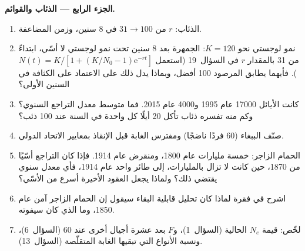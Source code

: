 \begin{problem}
\medskip
\noindent\textbf{الجزء الرابع --- الذئاب والقوائم.}
\begin{enumerate}[resume]
  \item الذئاب: $r$ من $31 \to 100$ في 8 سنين، وزمن المضاعفة.
  \item نمو لوجستي نحو $K = 120$: الجمهرة بعد 8 سنين
        تحت نمو لوجستي لا أسّي، ابتداءً من 31
        بالمقدار $r$ في السؤال~19 (استعمل $N(t) = K/[1 + (K/N_{0} -
        1)\mathrm{e}^{-rt}]$). فأيهما يطابق المرصود 100 أفضل، وبماذا
        يدل ذلك على الاعتماد على الكثافة في السنين الأولى؟
  \item كانت الأيائل \num{17000} عام 1995 و\num{4000} عام 2015.
        فما متوسط معدل التراجع السنوي؟ وكم منه تفسره ذئاب تأكل
        \num{20} أيلًا كل واحدة في السنة عند 100 ذئب؟
  \item صنّف الببغاء (60 فردًا ناضجًا) ومفترس الغابة قبل
        الإنقاذ بمعايير الاتحاد الدولي.
  \item الحمام الزاجر: خمسة مليارات عام 1800، ومنقرض عام 1914. فإذا كان
        التراجع أسّيًا من 1870، حين كانت لا تزال بالمليارات،
        إلى طائر واحد عام 1914، فأي معدل سنوي يقتضي ذلك؟
        ولماذا يجعل  العقود الأخيرة أسرع من الأسّي؟
  \item اشرح في فقرة لماذا كان تحليل قابلية البقاء سيقول إن الحمام
        الزاجر آمن عام 1850، وما الذي كان سيفوته.
  \item لخّص: قيمة $N_{e}$ الحالية (السؤال~1)، و$F$ بعد عشرة
        أجيال أخرى عند 60 (السؤال~6)، ونسبة الأنواع التي تبقيها
        الغابة المتقلّصة (السؤال~13).
\end{enumerate}
\end{problem}
